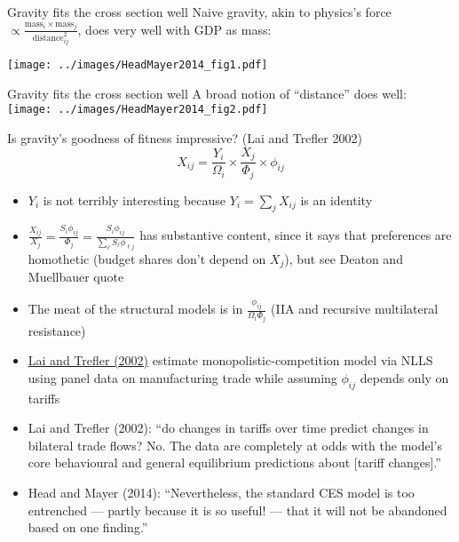\documentclass[10pt,notes=hide,aspectratio=169]{beamer}
\begin{document}
\begin{frame}{Gravity fits the cross section well}
Naive gravity,
akin to physics's force $\propto \frac{\text{mass}_i \times \text{mass}_j}{\text{distance}^{2}_{ij}}$,
does very well with GDP as mass:
\begin{center}
\texttt{[image: ../images/HeadMayer2014\_fig1.pdf]}
\end{center}
\end{frame}
\begin{frame}{Gravity fits the cross section well}
A broad notion of ``distance'' does well:
\texttt{[image: ../images/HeadMayer2014\_fig2.pdf]}
\end{frame}
\begin{frame}{Is gravity's goodness of fitness impressive? (Lai and Trefler 2002)}
\begin{equation*}
X_{ij} = {\frac{Y_i}{\Omega_i}} \times {\frac{X_j}{\Phi_j}} \times \phi_{ij}
\end{equation*}
\vspace{-4mm}
\begin{itemize}
	\item $Y_i$ is not terribly interesting because $Y_i = \sum_{j} X_{ij}$ is an identity
	\item $\frac{X_{ij}}{X_j} = \frac{S_{i} \phi_{ij}}{\Phi_j} = \frac{S_{i} \phi_{ij}}{\sum_{\ell} S_{\ell} \phi_{\ell j}}$ has substantive content, since it says that preferences are homothetic (budget shares don't depend on $X_j$), but see Deaton and Muellbauer quote
	\item The meat of the structural models is in $\frac{\phi_{ij}}{\Omega_i \Phi_j}$ (IIA and recursive multilateral resistance)
	\item \href{http://www-2.rotman.utoronto.ca/~dtrefler/papers/Lai_Trefler_2002.pdf}{Lai and Trefler (2002)} estimate monopolistic-competition model via NLLS using panel data on manufacturing trade while assuming $\phi_{ij}$ depends only on tariffs
	\item {Lai and Trefler (2002): ``do changes in tariffs over time predict changes in bilateral trade flows? No. The data are completely at odds with the model's core behavioural and general equilibrium predictions about  [tariff changes].''\par}
	\item {Head and Mayer (2014): ``Nevertheless, the standard CES model is too entrenched — partly because it is so useful! — that it will not be abandoned based on one finding.''\par}
\end{itemize}
\end{frame}
\end{document}
